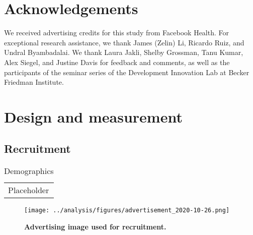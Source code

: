 \documentclass[letterpaper, 12pt, parskip=full,DIV=10]{scrartcl}
\begin{document}
\section{Acknowledgements}
We received advertising credits for this study from Facebook Health. For exceptional research assistance, we thank James (Zelin) Li, Ricardo Ruiz, and Undral Byambadalai. We thank Laura Jakli, Shelby Grossman, Tanu Kumar, Alex Siegel, and Justine Davis for feedback and comments, as well as the participants of the seminar series of the Development Innovation Lab at Becker Friedman Institute. %








\appendix
{}\label{SI}
\renewcommand\thefigure{S\arabic{figure}} 
\renewcommand\thetable{S\arabic{table}} 
 \renewcommand{\thesection}{S\arabic{section}}
\renewcommand*{\thepage}{SI.\arabic{page}}
\setcounter{figure}{0} 
\setcounter{table}{0} 
\appendixpage


  \startcontents
  
  \clearpage
  
\section{Design and measurement}

\subsection{Recruitment}

\begin{table}[htbp]
   \centering
   \begin{tabular}{l} 
   Placeholder
   \end{tabular}
   \caption{Demographics}
   \label{tab:demographics}
\end{table}


\begin{figure}[H]
\centering
\texttt{[image: ../analysis/figures/advertisement\_2020-10-26.png]}
   \caption{\textbf{Advertising image used for recruitment.}}
   \label{fig:recruitment}
\end{figure}
\end{document}
